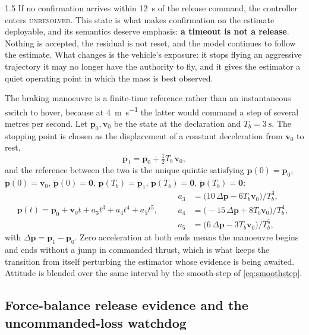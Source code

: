 \begin{spacing}{1.5}
If no confirmation arrives within \SI{12}{\second} of the release command, the
controller enters \textsc{unresolved}. This state is what makes confirmation on
the estimate deployable, and its semantics deserve emphasis: \textbf{a timeout is
not a release}. Nothing is accepted, the residual is not reset, and the model
continues to follow the estimate. What changes is the vehicle's exposure:
it stops flying an aggressive trajectory it may no longer have the authority to
fly, and it gives the estimator a quiet operating point in which the mass is
best observed.

The braking manoeuvre is a finite-time reference rather than an instantaneous
switch to hover, because at \SI{4}{\meter\per\second} the latter would command a
step of several metres per second. Let $\bm p_0,\bm v_0$ be the state at the
declaration and $T_b=\SI{3}{\second}$. The stopping point is chosen as the
displacement of a constant deceleration from $\bm v_0$ to rest,
\begin{equation}
\bm p_1 = \bm p_0 + \tfrac{1}{2} T_b\, \bm v_0 ,
\label{eq:brakep1}
\end{equation}
and the reference between the two is the unique quintic satisfying
$\bm p(0)=\bm p_0$, $\dot{\bm p}(0)=\bm v_0$, $\ddot{\bm p}(0)=\bm 0$,
$\bm p(T_b)=\bm p_1$, $\dot{\bm p}(T_b)=\bm 0$, $\ddot{\bm p}(T_b)=\bm 0$:
\begin{equation}
\bm p(t) = \bm p_0 + \bm v_0 t + a_3 t^3 + a_4 t^4 + a_5 t^5,
\qquad
\begin{aligned}
a_3 &= \bigl(10\,\Delta\bm p - 6 T_b \bm v_0\bigr)/T_b^3,\\
a_4 &= \bigl(-15\,\Delta\bm p + 8 T_b \bm v_0\bigr)/T_b^4,\\
a_5 &= \bigl(6\,\Delta\bm p - 3 T_b \bm v_0\bigr)/T_b^5,
\end{aligned}
\label{eq:quintic}
\end{equation}
with $\Delta\bm p=\bm p_1-\bm p_0$. Zero acceleration at both ends means the
manoeuvre begins and ends without a jump in commanded thrust, which is what
keeps the transition from itself perturbing the estimator whose evidence is being
awaited. Attitude is blended over the same interval by the smooth-step of
\eqref{eq:smoothstep}.

\subsection{Force-balance release evidence and the uncommanded-loss watchdog}\label{sec:frame:accdet}


\end{spacing}
